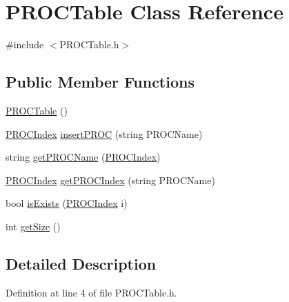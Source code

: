 \hypertarget{class_p_r_o_c_table}{\section{P\-R\-O\-C\-Table Class Reference}
\label{class_p_r_o_c_table}
}


{\ttfamily \#include $<$P\-R\-O\-C\-Table.\-h$>$}

\subsection*{Public Member Functions}
\begin{DoxyCompactItemize}
\item 
\hyperlink{class_p_r_o_c_table_ae47886261b2133db8dfaef035a8b5e86}{P\-R\-O\-C\-Table} ()
\item 
\hyperlink{_p_r_o_c_table_8h_a5440d93cde0c3651bf66bf75c77bf1b9}{P\-R\-O\-C\-Index} \hyperlink{class_p_r_o_c_table_ab9d9433d1944bed976173ea489d0cc16}{insert\-P\-R\-O\-C} (string P\-R\-O\-C\-Name)
\item 
string \hyperlink{class_p_r_o_c_table_a14ba41df2d1ded70867e7c4c047feb11}{get\-P\-R\-O\-C\-Name} (\hyperlink{_p_r_o_c_table_8h_a5440d93cde0c3651bf66bf75c77bf1b9}{P\-R\-O\-C\-Index})
\item 
\hyperlink{_p_r_o_c_table_8h_a5440d93cde0c3651bf66bf75c77bf1b9}{P\-R\-O\-C\-Index} \hyperlink{class_p_r_o_c_table_a9984496728a855e3d7815a6b518d4b5a}{get\-P\-R\-O\-C\-Index} (string P\-R\-O\-C\-Name)
\item 
bool \hyperlink{class_p_r_o_c_table_ac253ff3421050856f9f133d39bcb37ae}{is\-Exists} (\hyperlink{_p_r_o_c_table_8h_a5440d93cde0c3651bf66bf75c77bf1b9}{P\-R\-O\-C\-Index} i)
\item 
int \hyperlink{class_p_r_o_c_table_a3e3c64ee427bf7ae177f5222591b1ab0}{get\-Size} ()
\end{DoxyCompactItemize}


\subsection{Detailed Description}


Definition at line 4 of file P\-R\-O\-C\-Table.\-h.




